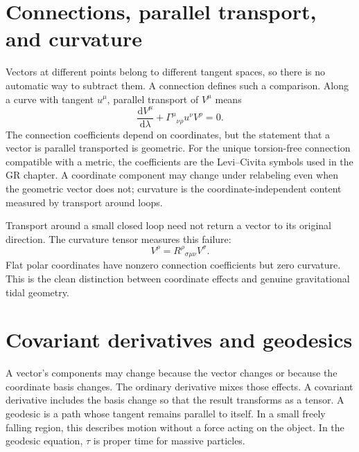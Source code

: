 \documentclass[11pt,oneside]{book}
\newcommand{\dd}{\mathrm{d}}
\theoremstyle{reviewstyle}
\begin{document}
\section{Connections, parallel transport, and curvature}
Vectors at different points belong to different tangent spaces, so there is no automatic way to subtract them. A connection defines such a comparison. Along a curve with tangent $u^\mu$, parallel transport of $V^\mu$ means
\begin{equation}
\frac{\dd V^\mu}{\dd\lambda}+\Gamma^\mu{}_{\nu\rho}u^\nu V^\rho=0.
\end{equation}
The connection coefficients depend on coordinates, but the statement that a vector is parallel transported is geometric. For the unique torsion-free connection compatible with a metric, the coefficients are the Levi--Civita symbols used in the GR chapter. A coordinate component may change under relabeling even when the geometric vector does not; curvature is the coordinate-independent content measured by transport around loops.

Transport around a small closed loop need not return a vector to its original direction. The curvature tensor measures this failure:
\begin{equation}
[\nabla_\mu,\nabla_\nu]V^\rho
=R^\rho{}_{\sigma\mu\nu}V^\sigma.
\end{equation}
Flat polar coordinates have nonzero connection coefficients but zero curvature. This is the clean distinction between coordinate effects and genuine gravitational tidal geometry.

\section{Covariant derivatives and geodesics}
A vector's components may change because the vector changes or because the coordinate basis changes. The ordinary derivative mixes those effects. A covariant derivative includes the basis change so that the result transforms as a tensor. A geodesic is a path whose tangent remains parallel to itself. In a small freely falling region, this describes motion without a force acting on the object. In the geodesic equation, $\tau$ is proper time for massive particles.
\end{document}
